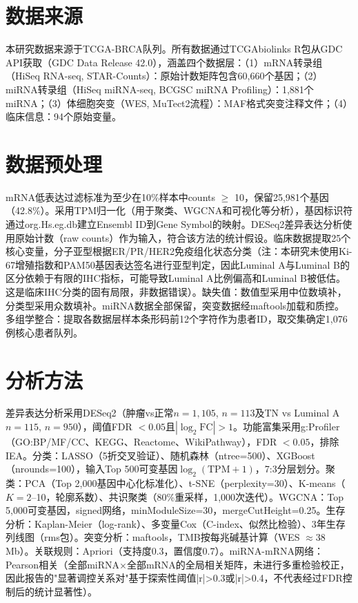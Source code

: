 \documentclass[12pt,a4paper,openany]{ctexbook}
\begin{document}
\section{数据来源}
本研究数据来源于TCGA-BRCA队列。所有数据通过TCGAbiolinks R包\cite{colaprico2016tcgabiolinks}从GDC API获取（GDC Data Release 42.0），涵盖四个数据层：（1）mRNA转录组（HiSeq RNA-seq, STAR-Counts）：原始计数矩阵包含60,660个基因；（2）miRNA转录组（HiSeq miRNA-seq, BCGSC miRNA Profiling）：1,881个miRNA；（3）体细胞突变（WES, MuTect2流程）：MAF格式突变注释文件；（4）临床信息：94个原始变量。

\section{数据预处理}
mRNA低表达过滤标准为至少在10\%样本中counts $\geq$ 10，保留25,981个基因（42.8\%）。采用TPM归一化（用于聚类、WGCNA和可视化等分析），基因标识符通过org.Hs.eg.db建立Ensembl ID到Gene Symbol的映射。DESeq2差异表达分析使用原始计数（raw counts）作为输入，符合该方法的统计假设。临床数据提取25个核心变量，分子亚型根据ER/PR/HER2免疫组化状态分类（注：本研究未使用Ki-67增殖指数和PAM50基因表达签名进行亚型判定，因此Luminal A与Luminal B的区分依赖于有限的IHC指标，可能导致Luminal A比例偏高和Luminal B被低估。这是临床IHC分类的固有局限，非数据错误）。缺失值：数值型采用中位数填补，分类型采用众数填补。miRNA数据全部保留，突变数据经maftools\cite{mayakonda2018maftools}加载和质控。多组学整合：提取各数据层样本条形码前12个字符作为患者ID，取交集确定1,076例核心患者队列。

\section{分析方法}
差异表达分析采用DESeq2\cite{love2014moderated}（肿瘤vs正常$n=1,105$, $n=113$及TN vs Luminal A $n=115$, $n=950$），阈值FDR $<0.05$且$|\log_2\text{FC}|>1$。功能富集采用g:Profiler\cite{kolberg2023gprofiler}（GO:BP/MF/CC、KEGG、Reactome、WikiPathway），FDR $<0.05$，排除IEA。分类：LASSO（5折交叉验证）、随机森林（ntree=500）、XGBoost（nrounds=100），输入Top 500可变基因$\log_2(\text{TPM}+1)$，7:3分层划分。聚类：PCA（Top 2,000基因中心化标准化）、t-SNE（perplexity=30）、K-means（$K=2$--10，轮廓系数）、共识聚类\cite{wilkerson2010consensus}（80\%重采样，1,000次迭代）。WGCNA\cite{langfelder2008wgcna}：Top 5,000可变基因，signed网络，minModuleSize=30，mergeCutHeight=0.25。生存分析：Kaplan-Meier（log-rank）、多变量Cox（C-index、似然比检验）、3年生存列线图（rms包）。突变分析：maftools\cite{mayakonda2018maftools}，TMB按每兆碱基计算（WES $\approx$38 Mb）。关联规则：Apriori（支持度0.3，置信度0.7）。miRNA-mRNA网络：Pearson相关（全部miRNA×全部mRNA的全局相关矩阵，未进行多重检验校正，因此报告的"显著调控关系对"基于探索性阈值|r|>0.3或|r|>0.4，不代表经过FDR控制后的统计显著性）。
\end{document}
